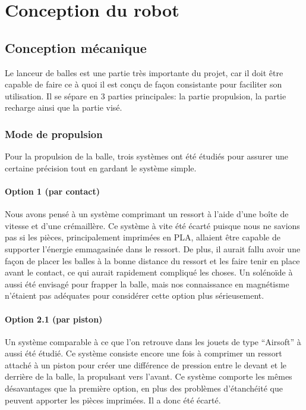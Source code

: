 
\section{Conception du robot}

\subsection{Conception mécanique}

Le lanceur de balles est une partie très importante du projet,
car il doit être capable de faire ce à quoi il est conçu de façon consistante pour faciliter son utilisation.
Il se sépare en 3 parties principales: la partie propulsion, la partie recharge ainsi que la partie visé.

\subsubsection{Mode de propulsion}
Pour la propulsion de la balle, trois systèmes ont été étudiés pour assurer une certaine précision tout en gardant le système simple.

\paragraph{Option 1 (par contact)}
Nous avons pensé à un système comprimant un ressort à l’aide d’une boîte de vitesse et d’une crémaillère.
Ce système à vite été écarté puisque nous ne savions pas si les pièces, principalement imprimées en PLA, allaient être capable de supporter l'énergie emmagasinée dans le ressort.
De plus, il aurait fallu avoir une façon de placer les balles à la bonne distance du ressort et les faire tenir en place avant le contact, ce qui aurait rapidement compliqué les choses.
Un solénoïde à aussi été envisagé pour frapper la balle, mais nos connaissance en magnétisme n’étaient pas adéquates pour considérer cette option plus sérieusement.


\paragraph{Option 2.1 (par piston)}
Un système comparable à ce que l’on retrouve dans les jouets de type “Airsoft” à aussi été étudié.
Ce système consiste encore une fois à comprimer un ressort attaché à un piston pour créer une différence de pression entre le devant et le derrière de la balle, la propulsant vers l’avant.
Ce système comporte les mêmes désavantages que la première option, en plus des problèmes d’étanchéité que peuvent apporter les pièces imprimées.
Il a donc été écarté.

